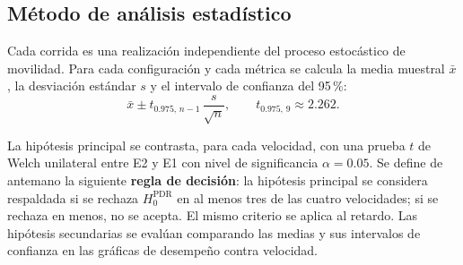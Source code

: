 \subsection{Método de análisis estadístico}
\label{sec:analisis-est}

Cada corrida es una realización independiente del proceso estocástico de movilidad. Para cada configuración y cada métrica se calcula la
media muestral $\bar{x}$, la desviación estándar $s$ y el intervalo de confianza del
95\,\%:
\[
\bar{x} \pm t_{0.975,\,n-1}\,\frac{s}{\sqrt{n}},
\qquad t_{0.975,\,9} \approx 2.262 .
\]

La hipótesis principal se contrasta, para cada velocidad, con una prueba $t$ de Welch
unilateral entre E2 y E1 con nivel de significancia $\alpha = 0.05$. Se define de
antemano la siguiente \textbf{regla de decisión}: la hipótesis principal se considera
respaldada si se rechaza $H_0^{\mathrm{PDR}}$ en al menos tres de las cuatro
velocidades; si se rechaza en menos, no se acepta. El mismo criterio se aplica al
retardo. Las hipótesis secundarias se evalúan comparando las medias y sus intervalos de
confianza en las gráficas de desempeño contra velocidad.
